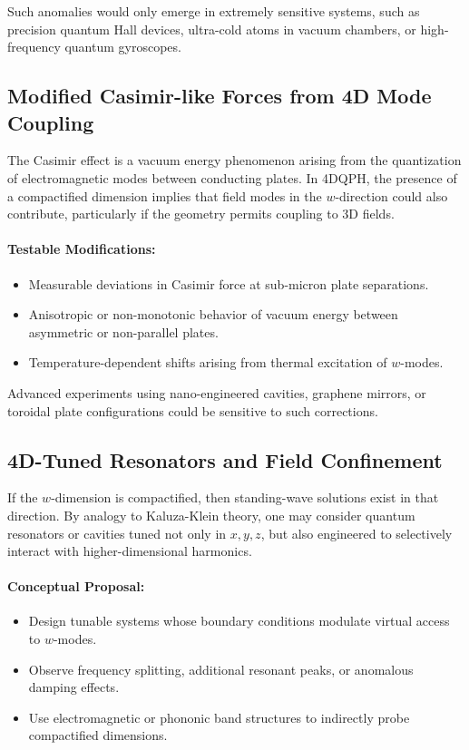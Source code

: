 \documentclass[12pt]{article}
\begin{document}
Such anomalies would only emerge in extremely sensitive systems, such as precision quantum Hall devices, ultra-cold atoms in vacuum chambers, or high-frequency quantum gyroscopes.

\subsection{Modified Casimir-like Forces from 4D Mode Coupling}

The Casimir effect is a vacuum energy phenomenon arising from the quantization of electromagnetic modes between conducting plates. In 4DQPH, the presence of a compactified dimension implies that field modes in the \( w \)-direction could also contribute, particularly if the geometry permits coupling to 3D fields.

\paragraph{Testable Modifications:}
\begin{itemize}
    \item Measurable deviations in Casimir force at sub-micron plate separations.
    \item Anisotropic or non-monotonic behavior of vacuum energy between asymmetric or non-parallel plates.
    \item Temperature-dependent shifts arising from thermal excitation of \( w \)-modes.
\end{itemize}

Advanced experiments using nano-engineered cavities, graphene mirrors, or toroidal plate configurations could be sensitive to such corrections.

\subsection{4D-Tuned Resonators and Field Confinement}

If the \( w \)-dimension is compactified, then standing-wave solutions exist in that direction. By analogy to Kaluza-Klein theory, one may consider quantum resonators or cavities tuned not only in \( x, y, z \), but also engineered to selectively interact with higher-dimensional harmonics.

\paragraph{Conceptual Proposal:}
\begin{itemize}
    \item Design tunable systems whose boundary conditions modulate virtual access to \( w \)-modes.
    \item Observe frequency splitting, additional resonant peaks, or anomalous damping effects.
    \item Use electromagnetic or phononic band structures to indirectly probe compactified dimensions.
\end{itemize}
\end{document}
